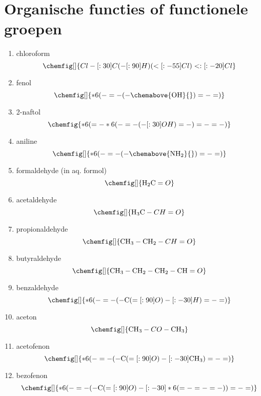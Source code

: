 \documentclass[a4paper,12pt]{article}
\begin{document}
    \section*{Organische functies of functionele groepen}
    \begin{enumerate}
        \item chloroform $$\chemfig[]{Cl-[:30]C(-[:90]H)(<[:-55]Cl)<:[:-20]Cl}$$
        \item fenol $$\chemfig[]{*6(-=-(-\chemabove{\ce{OH}}{})=-=)}$$
        \item 2-naftol $$\chemfig{*6(=-*6(-=-(-[:30]OH)=-)=-=-)}$$
        \item aniline $$\chemfig[]{*6(-=-(-\chemabove{\ce{NH2}}{})=-=)}$$
        \item formaldehyde (in aq. formol) $$\chemfig[]{\ce{H2C}=O}$$
        \item acetaldehyde $$\chemfig[]{\ce{H3C}-CH=O}$$
        \item propionaldehyde $$\chemfig[]{\ce{CH3}-\ce{CH2}-CH=O}$$
        \item butyraldehyde $$\chemfig[]{\ce{CH3}-\ce{CH2}-\ce{CH2}-\ce{CH}=O}$$
        \item benzaldehyde $$\chemfig[]{*6(-=-(-\ce{C}(=[:90]O)-[:-30]H)=-=)}$$
        \item aceton $$\chemfig[]{\ce{CH3}-CO-\ce{CH3}}$$
        \item acetofenon $$\chemfig[]{*6(-=-(-\ce{C}(=[:90]O)-[:-30]\ce{CH3})=-=)}$$
        \item bezofenon $$\chemfig[]{*6(-=-(-\ce{C}(=[:90]O)-[:-30]*6(=-=-=-))=-=)}$$
    \end{enumerate}
\end{document}
